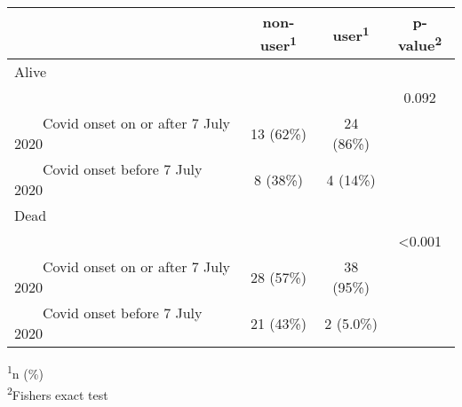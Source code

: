 \setlength{\LTpost}{0mm}
\begin{longtable}{lccc}
\toprule
 & \textbf{non-user}\textsuperscript{1} & \textbf{user}\textsuperscript{1} & \textbf{p-value}\textsuperscript{2} \\ 
\midrule
\multicolumn{4}{l}{Alive} \\ 
\midrule
 &  &  & 0.092 \\ 
    Covid onset on or after 7 July 2020 & 13 (62\%) & 24 (86\%) &  \\ 
    Covid onset before 7 July 2020 & 8 (38\%) & 4 (14\%) &  \\ 
\midrule
\multicolumn{4}{l}{Dead} \\ 
\midrule
 &  &  & <0.001 \\ 
    Covid onset on or after 7 July 2020 & 28 (57\%) & 38 (95\%) &  \\ 
    Covid onset before 7 July 2020 & 21 (43\%) & 2 (5.0\%) &  \\ 
\bottomrule
\end{longtable}
\begin{minipage}{\linewidth}
\textsuperscript{1}n (\%)\\
\textsuperscript{2}Fisher\textquotesingle{}s exact test\\
\end{minipage}

